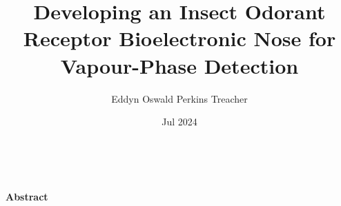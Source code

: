 \documentclass[
  a4paper,
]{scrbook}
\title{Developing an Insect Odorant Receptor Bioelectronic Nose for
Vapour-Phase Detection}
\author{Eddyn Oswald Perkins Treacher}
\date{Jul 2024}
\begin{document}
\frontmatter

\maketitle

\clearpage
\newpage
\thispagestyle{empty} %
\mbox{~}
\clearpage
\newpage


\begin{flushleft}
\huge\textbf{Abstract}
\end{flushleft}

\vspace*{\baselineskip}
\end{document}
